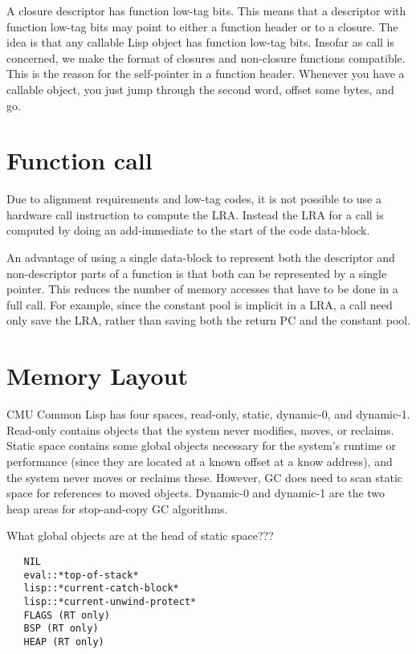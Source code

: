 A closure descriptor has function low-tag bits.  This means that a descriptor
with function low-tag bits may point to either a function header or to a
closure.  The idea is that any callable Lisp object has function low-tag bits.
Insofar as call is concerned, we make the format of closures and non-closure
functions compatible.  This is the reason for the self-pointer in a function
header.  Whenever you have a callable object, you just jump through the second
word, offset some bytes, and go.



\section{Function call}

Due to alignment requirements and low-tag codes, it is not possible to use a
hardware call instruction to compute the LRA.  Instead the LRA
for a call is computed by doing an add-immediate to the start of the code
data-block.

An advantage of using a single data-block to represent both the descriptor and
non-descriptor parts of a function is that both can be represented by a
single pointer.  This reduces the number of memory accesses that have to be
done in a full call.  For example, since the constant pool is implicit in a
LRA, a call need only save the LRA, rather than saving both the
return PC and the constant pool.



\section{Memory Layout}

CMU Common Lisp has four spaces, read-only, static, dynamic-0, and dynamic-1.
Read-only contains objects that the system never modifies, moves, or reclaims.
Static space contains some global objects necessary for the system's runtime or
performance (since they are located at a known offset at a know address), and
the system never moves or reclaims these.  However, GC does need to scan static
space for references to moved objects.  Dynamic-0 and dynamic-1 are the two
heap areas for stop-and-copy GC algorithms.

What global objects are at the head of static space???
\begin{verbatim}
   NIL
   eval::*top-of-stack*
   lisp::*current-catch-block*
   lisp::*current-unwind-protect*
   FLAGS (RT only)
   BSP (RT only)
   HEAP (RT only)
\end{verbatim}

